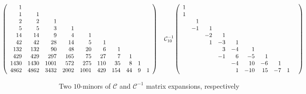 
\begin{table}
    \begin{displaymath} 
        \hspace{-4cm}
        \mathcal{C}_{10} \left(\begin{array}{rrrrrrrrrr}
        1 &  &  &  &  &  &  &  &  &  \\
        1 & 1 &  &  &  &  &  &  &  &  \\
        2 & 2 & 1 &  &  &  &  &  &  &  \\
        5 & 5 & 3 & 1 &  &  &  &  &  &  \\
        14 & 14 & 9 & 4 & 1 &  &  &  &  &  \\
        42 & 42 & 28 & 14 & 5 & 1 &  &  &  &  \\
        132 & 132 & 90 & 48 & 20 & 6 & 1 &  &  &  \\
        429 & 429 & 297 & 165 & 75 & 27 & 7 & 1 &  &  \\
        1430 & 1430 & 1001 & 572 & 275 & 110 & 35 & 8 & 1 &  \\
        4862 & 4862 & 3432 & 2002 & 1001 & 429 & 154 & 44 & 9 & 1
        \end{array}\right) 
        \quad
        \mathcal{C}_{10}^{-1}\left(\begin{array}{rrrrrrrrrr}
        1 &  &  &  &  &  &  &  &  &  \\
        1 &  &  &  &  &  &  &  &  &  \\
         & 1 &  &  &  &  &  &  &  &  \\
         & -1 & 1 &  &  &  &  &  &  &  \\
         &  & -2 & 1 &  &  &  &  &  &  \\
         &  & 1 & -3 & 1 &  &  &  &  &  \\
         &  &  & 3 & -4 & 1 &  &  &  &  \\
         &  &  & -1 & 6 & -5 & 1 &  &  &  \\
         &  &  &  & -4 & 10 & -6 & 1 &  &  \\
         &  &  &  & 1 & -10 & 15 & -7 & 1 & 
        \end{array}\right)
    \end{displaymath}

  \caption[$\mathcal{C}$ and $\mathcal{C}^{-1}$]{Two $10$-minors of
  $\mathcal{C}$ and $\mathcal{C}^{-1}$ matrix expansions, respectively}

  \label{tab:catalan:array} 

\end{table}
